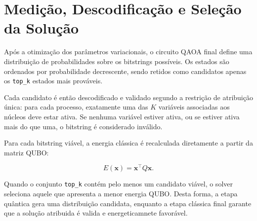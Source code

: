 \section{Medição, Descodificação e Seleção da Solução}
\label{sec:medicao-descodificacao-selecao}

Após a otimização dos parâmetros variacionais, o circuito \acs{QAOA} final
define uma distribuição de probabilidades sobre os bitstrings possíveis.
Os estados são ordenados por probabilidade decrescente, sendo retidos como
candidatos apenas os \texttt{top\_k} estados mais prováveis.


Cada candidato é então descodificado e validado segundo a restrição de
atribuição única: para cada processo, exatamente uma das $K$ variáveis
associadas aos núcleos deve estar ativa. Se nenhuma variável estiver ativa,
ou se estiver ativa mais do que uma, o bitstring é considerado inválido.

Para cada bitstring viável, a energia clássica é recalculada diretamente a partir
da matriz \acs{QUBO}:

\begin{equation}
    E(\mathbf{x}) = \mathbf{x}^{\top}Q\mathbf{x}.
\end{equation}

Quando o conjunto \texttt{top\_k} contém pelo menos um candidato viável, o
solver seleciona aquele que apresenta a menor energia \acs{QUBO}. Desta forma, a etapa quântica gera uma distribuição candidata, enquanto a etapa clássica final garante que a solução atribuida é valida e energeticamnete favorável.
